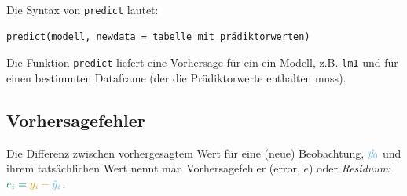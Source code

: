 \documentclass[
  letterpaper,
  twoside,
  open=any]{scrbook}
\theoremstyle{definition}
\theoremstyle{definition}
\theoremstyle{definition}
\theoremstyle{remark}
\begin{document}
Die Syntax von \texttt{predict} lautet:

\begin{verbatim}
predict(modell, newdata = tabelle_mit_prädiktorwerten)
\end{verbatim}

Die Funktion \texttt{predict} liefert eine Vorhersage für ein ein
Modell, z.B. \texttt{lm1} und für einen bestimmten Dataframe (der die
Prädiktorwerte enthalten muss).

\subsection{Vorhersagefehler}\label{vorhersagefehler}

Die Differenz zwischen vorhergesagtem Wert für eine (neue) Beobachtung,
\(\color{modelcol}{\hat{y_0}}\) und ihrem tatsächlichen Wert nennt man
Vorhersagefehler (error, \(e\)) oder \emph{Residuum}:
\(\color{errorcol}{e_i} = \color{ycol}{y_i} - \color{modelcol}{\hat{y}_i}\).
\end{document}
